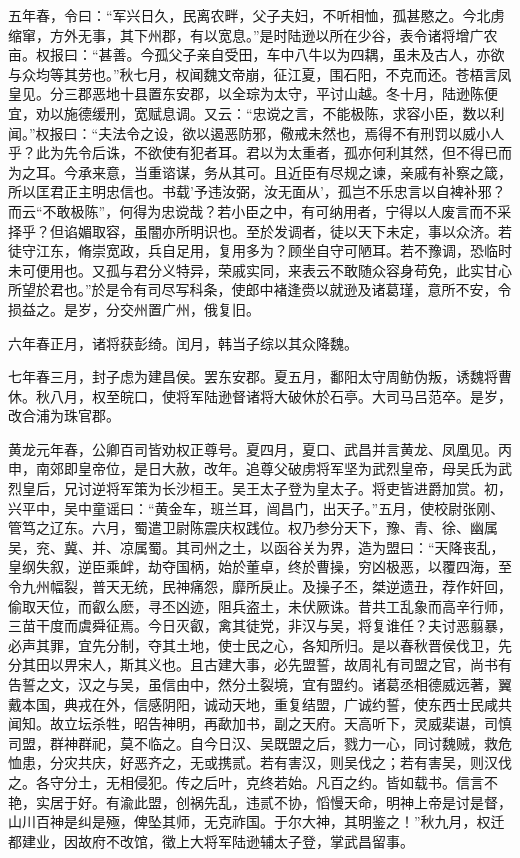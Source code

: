 \documentclass[12pt,UTF8]{ctexbook}
\begin{document}
五年春，令曰：“军兴日久，民离农畔，父子夫妇，不听相恤，孤甚愍之。今北虏缩窜，方外无事，其下州郡，有以宽息。”是时陆逊以所在少谷，表令诸将增广农亩。权报曰：“甚善。今孤父子亲自受田，车中八牛以为四耦，虽未及古人，亦欲与众均等其劳也。”秋七月，权闻魏文帝崩，征江夏，围石阳，不克而还。苍梧言凤皇见。分三郡恶地十县置东安郡，以全琮为太守，平讨山越。冬十月，陆逊陈便宜，劝以施德缓刑，宽赋息调。又云：“忠谠之言，不能极陈，求容小臣，数以利闻。”权报曰：“夫法令之设，欲以遏恶防邪，儆戒未然也，焉得不有刑罚以威小人乎？此为先令后诛，不欲使有犯者耳。君以为太重者，孤亦何利其然，但不得已而为之耳。今承来意，当重谘谋，务从其可。且近臣有尽规之谏，亲戚有补察之箴，所以匡君正主明忠信也。书载'予违汝弼，汝无面从’，孤岂不乐忠言以自裨补邪？而云“不敢极陈”，何得为忠谠哉？若小臣之中，有可纳用者，宁得以人废言而不采择乎？但谄媚取容，虽闇亦所明识也。至於发调者，徒以天下未定，事以众济。若徒守江东，脩崇宽政，兵自足用，复用多为？顾坐自守可陋耳。若不豫调，恐临时未可便用也。又孤与君分义特异，荣戚实同，来表云不敢随众容身苟免，此实甘心所望於君也。”於是令有司尽写科条，使郎中褚逢赍以就逊及诸葛瑾，意所不安，令损益之。是岁，分交州置广州，俄复旧。

六年春正月，诸将获彭绮。闰月，韩当子综以其众降魏。

七年春三月，封子虑为建昌侯。罢东安郡。夏五月，鄱阳太守周鲂伪叛，诱魏将曹休。秋八月，权至皖口，使将军陆逊督诸将大破休於石亭。大司马吕范卒。是岁，改合浦为珠官郡。

黄龙元年春，公卿百司皆劝权正尊号。夏四月，夏口、武昌并言黄龙、凤凰见。丙申，南郊即皇帝位，是日大赦，改年。追尊父破虏将军坚为武烈皇帝，母吴氏为武烈皇后，兄讨逆将军策为长沙桓王。吴王太子登为皇太子。将吏皆进爵加赏。初，兴平中，吴中童谣曰：“黄金车，班兰耳，闿昌门，出天子。”五月，使校尉张刚、管笃之辽东。六月，蜀遣卫尉陈震庆权践位。权乃参分天下，豫、青、徐、幽属吴，兖、冀、并、凉属蜀。其司州之土，以函谷关为界，造为盟曰：“天降丧乱，皇纲失叙，逆臣乘衅，劫夺国柄，始於董卓，终於曹操，穷凶极恶，以覆四海，至令九州幅裂，普天无统，民神痛怨，靡所戾止。及操子丕，桀逆遗丑，荐作奸回，偷取天位，而叡么麽，寻丕凶迹，阻兵盗土，未伏厥诛。昔共工乱象而高辛行师，三苗干度而虞舜征焉。今日灭叡，禽其徒党，非汉与吴，将复谁任？夫讨恶翦暴，必声其罪，宜先分制，夺其土地，使士民之心，各知所归。是以春秋晋侯伐卫，先分其田以畀宋人，斯其义也。且古建大事，必先盟誓，故周礼有司盟之官，尚书有告誓之文，汉之与吴，虽信由中，然分土裂境，宜有盟约。诸葛丞相德威远著，翼戴本国，典戎在外，信感阴阳，诚动天地，重复结盟，广诚约誓，使东西士民咸共闻知。故立坛杀牲，昭告神明，再歃加书，副之天府。天高听下，灵威棐谌，司慎司盟，群神群祀，莫不临之。自今日汉、吴既盟之后，戮力一心，同讨魏贼，救危恤患，分灾共庆，好恶齐之，无或携贰。若有害汉，则吴伐之；若有害吴，则汉伐之。各守分土，无相侵犯。传之后叶，克终若始。凡百之约。皆如载书。信言不艳，实居于好。有渝此盟，创祸先乱，违贰不协，慆慢天命，明神上帝是讨是督，山川百神是纠是殛，俾坠其师，无克祚国。于尔大神，其明鉴之！”秋九月，权迁都建业，因故府不改馆，徵上大将军陆逊辅太子登，掌武昌留事。
\end{document}
